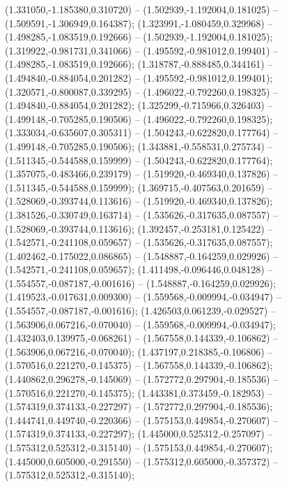  (1.331050,-1.185380,0.310720) -- (1.502939,-1.192004,0.181025) -- (1.509591,-1.306949,0.164387);
 (1.323991,-1.080459,0.329968) -- (1.498285,-1.083519,0.192666) -- (1.502939,-1.192004,0.181025);
 (1.319922,-0.981731,0.341066) -- (1.495592,-0.981012,0.199401) -- (1.498285,-1.083519,0.192666);
 (1.318787,-0.888485,0.344161) -- (1.494840,-0.884054,0.201282) -- (1.495592,-0.981012,0.199401);
 (1.320571,-0.800087,0.339295) -- (1.496022,-0.792260,0.198325) -- (1.494840,-0.884054,0.201282);
 (1.325299,-0.715966,0.326403) -- (1.499148,-0.705285,0.190506) -- (1.496022,-0.792260,0.198325);
 (1.333034,-0.635607,0.305311) -- (1.504243,-0.622820,0.177764) -- (1.499148,-0.705285,0.190506);
 (1.343881,-0.558531,0.275734) -- (1.511345,-0.544588,0.159999) -- (1.504243,-0.622820,0.177764);
 (1.357075,-0.483466,0.239179) -- (1.519920,-0.469340,0.137826) -- (1.511345,-0.544588,0.159999);
 (1.369715,-0.407563,0.201659) -- (1.528069,-0.393744,0.113616) -- (1.519920,-0.469340,0.137826);
 (1.381526,-0.330749,0.163714) -- (1.535626,-0.317635,0.087557) -- (1.528069,-0.393744,0.113616);
 (1.392457,-0.253181,0.125422) -- (1.542571,-0.241108,0.059657) -- (1.535626,-0.317635,0.087557);
 (1.402462,-0.175022,0.086865) -- (1.548887,-0.164259,0.029926) -- (1.542571,-0.241108,0.059657);
 (1.411498,-0.096446,0.048128) -- (1.554557,-0.087187,-0.001616) -- (1.548887,-0.164259,0.029926);
 (1.419523,-0.017631,0.009300) -- (1.559568,-0.009994,-0.034947) -- (1.554557,-0.087187,-0.001616);
 (1.426503,0.061239,-0.029527) -- (1.563906,0.067216,-0.070040) -- (1.559568,-0.009994,-0.034947);
 (1.432403,0.139975,-0.068261) -- (1.567558,0.144339,-0.106862) -- (1.563906,0.067216,-0.070040);
 (1.437197,0.218385,-0.106806) -- (1.570516,0.221270,-0.145375) -- (1.567558,0.144339,-0.106862);
 (1.440862,0.296278,-0.145069) -- (1.572772,0.297904,-0.185536) -- (1.570516,0.221270,-0.145375);
 (1.443381,0.373459,-0.182953) -- (1.574319,0.374133,-0.227297) -- (1.572772,0.297904,-0.185536);
 (1.444741,0.449740,-0.220366) -- (1.575153,0.449854,-0.270607) -- (1.574319,0.374133,-0.227297);
 (1.445000,0.525312,-0.257097) -- (1.575312,0.525312,-0.315140) -- (1.575153,0.449854,-0.270607);
 (1.445000,0.605000,-0.291550) -- (1.575312,0.605000,-0.357372) -- (1.575312,0.525312,-0.315140);
